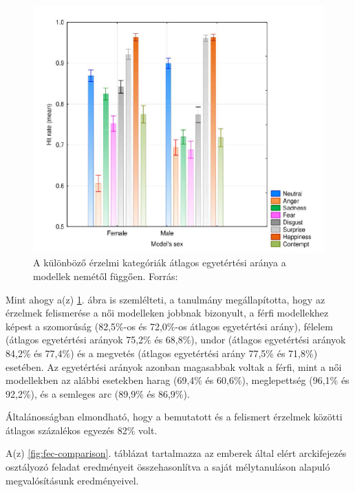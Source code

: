 \documentclass[12pt,a4]{article}
\begin{document}
            \begin{figure}[h!]	
        		\centering
        		\includegraphics[width=1\linewidth]{facereqhuman.png}
                \caption{A különböző érzelmi kategóriák átlagos egyetértési aránya a modellek nemétől függően. Forrás: \cite{facerecresult}}
                \label{fig:humanfacerec}
        	\end{figure}
        
            Mint ahogy a(z) \ref{fig:humanfacerec}. ábra is szemlélteti, a tanulmány megállapította, hogy az érzelmek felismerése a női modelleken jobbnak bizonyult,
            a férfi modellekhez képest a szomorúság (82,5\%-os és 72,0\%-os átlagos egyetértési arány),
            félelem (átlagos egyetértési arányok 75,2\% és 68,8\%), undor (átlagos egyetértési arányok
            84,2\% és 77,4\%) és a megvetés (átlagos egyetértési arány 77,5\% és 71,8\%) esetében. Az egyetértési arányok azonban magasabbak voltak a férfi, mint a női modellekben az alábbi esetekben
            harag (69,4\% és 60,6\%), meglepettség (96,1\% és 92,2\%),
            és a semleges arc (89,9\% és 86,9\%). 
        
            Általánosságban elmondható, hogy a bemutatott és a felismert érzelmek közötti átlagos százalékos egyezés
            82\% volt.
    
            A(z) \ref{fig:fec-comparison}. táblázat tartalmazza az emberek által elért arckifejezés osztályozó feladat eredményeit összehasonlítva a saját mélytanuláson alapuló megvalósításunk eredményeivel.
    
\end{document}

